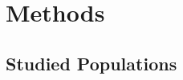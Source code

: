 \documentclass[11pt]{article}
\begin{document}

\vspace{8mm}
\section{Methods}





\subsection{Studied Populations}
\end{document}
